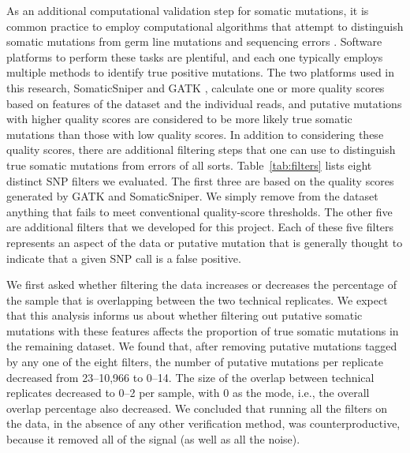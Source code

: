 \documentclass[11pt]{article} %
\begin{document}
As an additional computational validation step for somatic mutations, it is common practice to employ computational algorithms that attempt to distinguish somatic mutations from germ line mutations and sequencing errors \citep{SomaticSniper, mut_calling}. Software platforms to perform these tasks are plentiful, and each one typically employs multiple methods to identify true positive mutations. The two platforms used in this research, SomaticSniper \citep{SomaticSniper} and GATK \citep{GATK}, calculate one or more quality scores based on features of the dataset and the individual reads, and putative mutations with higher quality scores are considered to be more likely true somatic mutations than those with low quality scores. In addition to considering these quality scores, there are additional filtering steps that one can use to distinguish true somatic mutations from errors of all sorts. Table~\ref{tab:filters} lists eight distinct SNP filters we evaluated. The first three are based on the quality scores generated by GATK and SomaticSniper.  We simply remove from the dataset anything that fails to meet conventional quality-score thresholds. The other five are additional filters that we developed for this project. Each of these five filters represents an aspect of the data or putative mutation that is generally thought to indicate that a given SNP call is a false positive.

We first asked whether filtering the data increases or decreases the percentage of the sample that is overlapping between the two technical replicates. We expect that this analysis informs us about whether filtering out putative somatic mutations with these features affects the proportion of true somatic mutations in the remaining dataset. We found that, after removing putative mutations tagged by any one of the eight filters, the number of putative mutations per replicate decreased from 23--10,966 to 0--14. The size of the overlap between technical replicates decreased to 0--2 per sample, with 0 as the mode, i.e., the overall overlap percentage also decreased. We concluded that running all the filters on the data, in the absence of any other verification method, was counterproductive, because it removed all of the signal (as well as all the noise). 
\end{document}
